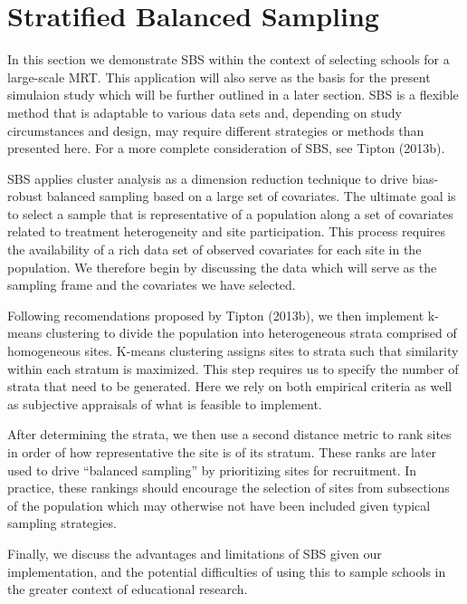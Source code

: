 \documentclass[man,floatsintext]{apa6}
\begin{document}
\hypertarget{stratified-balanced-sampling}{%
\section{Stratified Balanced Sampling}\label{stratified-balanced-sampling}}

In this section we demonstrate SBS within the context of selecting schools for a large-scale MRT. This application will also serve as the basis for the present simulaion study which will be further outlined in a later section. SBS is a flexible method that is adaptable to various data sets and, depending on study circumstances and design, may require different strategies or methods than presented here. For a more complete consideration of SBS, see Tipton (2013b).

SBS applies cluster analysis as a dimension reduction technique to drive bias-robust balanced sampling based on a large set of covariates. The ultimate goal is to select a sample that is representative of a population along a set of covariates related to treatment heterogeneity and site participation. This process requires the availability of a rich data set of observed covariates for each site in the population. We therefore begin by discussing the data which will serve as the sampling frame and the covariates we have selected.

Following recomendations proposed by Tipton (2013b), we then implement k-means clustering to divide the population into heterogeneous strata comprised of homogeneous sites. K-means clustering assigns sites to strata such that similarity within each stratum is maximized. This step requires us to specify the number of strata that need to be generated. Here we rely on both empirical criteria as well as subjective appraisals of what is feasible to implement.

After determining the strata, we then use a second distance metric to rank sites in order of how representative the site is of its stratum. These ranks are later used to drive \enquote{balanced sampling} by prioritizing sites for recruitment. In practice, these rankings should encourage the selection of sites from subsections of the population which may otherwise not have been included given typical sampling strategies.

Finally, we discuss the advantages and limitations of SBS given our implementation, and the potential difficulties of using this to sample schools in the greater context of educational research.
\end{document}
